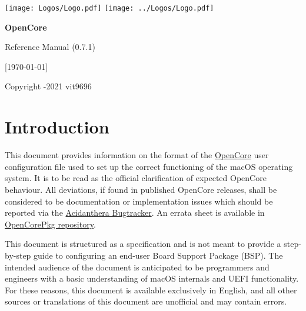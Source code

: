 \documentclass[]{article}
\begin{document}
\begin{titlepage}
   \begin{center}
       \vspace*{2.0in}

       \Huge

         {\texttt{[image: Logos/Logo.pdf]}}
         {\texttt{[image: ../Logos/Logo.pdf]}}

       \sffamily

       \textbf{OpenCore}

       \vspace{0.2in}

       Reference Manual (0.7.1)

       \vspace{0.2in}

        {[}\today{]}

       \normalsize

       \vfill

       \rmfamily

       Copyright -2021 vit9696

   \end{center}
\end{titlepage}

\tableofcontents

\section{Introduction}\label{introduction}

This document provides information on the format of the
\href{https://github.com/acidanthera/OpenCorePkg}{OpenCore} user
configuration file used to set up the correct functioning of the macOS
operating system. It is to be read as the official clarification of expected
OpenCore behaviour. All deviations, if found in published OpenCore releases,
shall be considered to be documentation or implementation issues which should be
reported via the \href{https://github.com/acidanthera/bugtracker}{Acidanthera Bugtracker}.
An errata sheet is available in
\href{https://github.com/acidanthera/OpenCorePkg/blob/master/Docs/Errata/Errata.pdf}{OpenCorePkg repository}.

This document is structured as a specification and is not meant to provide a step-by-step
guide to configuring an end-user Board Support Package (BSP). The intended audience
of the document is anticipated to be programmers and engineers with a basic understanding of macOS internals
and UEFI functionality. For these reasons, this document is available exclusively in English,
and all other sources or translations of this document are unofficial and may
contain errors.
\end{document}
